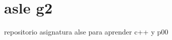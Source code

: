 \chapter{asle g2}
\hypertarget{md_readme}{}\label{md_readme}
\label{md_readme_autotoc_md0}%
%
 repositorio asignatura alse para aprender c++ y p00 